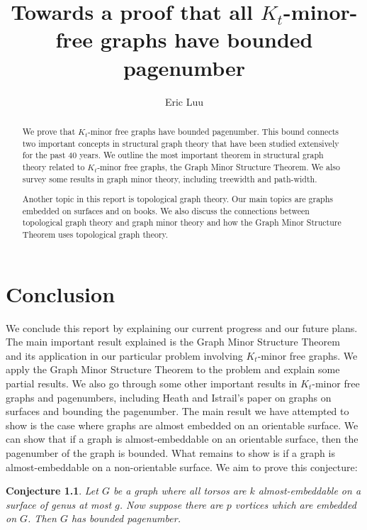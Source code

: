 \documentclass[notitlepage]{report}
\title{Towards a proof that all \(K_t\)-minor-free graphs have bounded pagenumber}
\author{Eric Luu}
\newtheorem{conjecture}[theorem]{Conjecture}
\theoremstyle{definition}
\numberwithin{theorem}{section}
\numberwithin{equation}{section}
\begin{document}
\maketitle
\begin{abstract}
	We prove that \(K_t\)-minor free graphs have bounded pagenumber. This bound connects two important concepts in structural graph theory that have been studied extensively for the past 40 years. We outline the most important theorem in structural graph theory related to \(K_t\)-minor free graphs, the Graph Minor Structure Theorem. We also survey some results in graph minor theory, including treewidth and path-width. 

	Another topic in this report is topological graph theory. Our main topics are graphs embedded on surfaces and on books. We also discuss the connections between topological graph theory and graph minor theory and how the Graph Minor Structure Theorem uses topological graph theory. 
\end{abstract}
\listoftodos

\setcounter{tocdepth}{1}
\tableofcontents











\chapter{Conclusion}\label{chap:conclusion}
We conclude this report by explaining our current progress and our future plans.
The main important result explained is the Graph Minor Structure Theorem~\cite{robertsonGraphMinorsXVI2003} and its application in our particular problem involving \(K_t\)-minor free graphs. We apply the Graph Minor Structure Theorem to the problem and explain some partial results.
We also go through some other important results in \(K_t\)-minor free graphs and pagenumbers, including Heath and Istrail's \cite{heathPagenumberGenusGraphs1992} paper on graphs on surfaces and bounding the pagenumber.
The main result we have attempted to show is the case where graphs are almost embedded on an orientable surface. We can show that if a graph is almost-embeddable on an orientable surface, then the pagenumber of the graph is bounded.
What remains to show is if a graph is almost-embeddable on a non-orientable surface.
We aim to prove this conjecture:
\begin{conjecture}
	Let $G$ be a graph where all torsos are $k$ almost-embeddable on a surface of genus at most $g$. Now suppose there are $p$ vortices which are embedded on $G$. Then $G$ has bounded pagenumber.
\end{conjecture}
\end{document}
